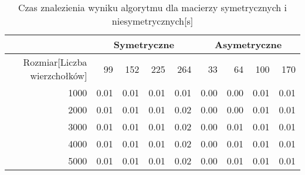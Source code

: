 \begin{table}
\begin{tabular}{|r|r|r|r|r|r|r|r|r|}
\hline
 & \multicolumn{4}{|c|}{Symetryczne} & \multicolumn{4}{|c|}{Asymetryczne} \\ \hline\
Rozmiar[Liczba wierzchołków] & 99 & 152 & 225 & 264 & 33 & 64 & 100 & 170 \\ \hline
1000 & 0.01 & 0.01 & 0.01 & 0.01 & 0.00 & 0.00 & 0.01 & 0.01 \\
2000 & 0.01 & 0.01 & 0.01 & 0.02 & 0.00 & 0.00 & 0.01 & 0.01 \\
3000 & 0.01 & 0.01 & 0.01 & 0.02 & 0.00 & 0.01 & 0.01 & 0.01 \\
4000 & 0.01 & 0.01 & 0.01 & 0.02 & 0.00 & 0.01 & 0.01 & 0.01 \\
5000 & 0.01 & 0.01 & 0.01 & 0.02 & 0.00 & 0.01 & 0.01 & 0.01 \\ \hline
\end{tabular}
\caption{Czas znalezienia wyniku algorytmu dla macierzy symetrycznych i niesymetrycznych[s]}
\label{tab:time_AnStart}
\end{table}
